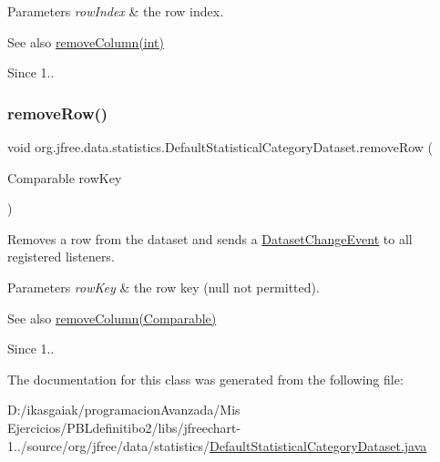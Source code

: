\begin{DoxyParams}{Parameters}
{\em row\+Index} & the row index.\\
\hline
\end{DoxyParams}
\begin{DoxySeeAlso}{See also}
\mbox{\hyperlink{classorg_1_1jfree_1_1data_1_1statistics_1_1_default_statistical_category_dataset_a1981755d8867127679bf11f59a7c62d4}{remove\+Column(int)}}
\end{DoxySeeAlso}
\begin{DoxySince}{Since}
1.. 
\end{DoxySince}
\mbox{\label{classorg_1_1jfree_1_1data_1_1statistics_1_1_default_statistical_category_dataset_a679a64d7b03d1530ebc792cb8aa01f7e}} 
\subsubsection{\texorpdfstring{remove\+Row()}{removeRow()}\hspace{0.1cm}{\footnotesize\ttfamily [2/2]}}
{\footnotesize\ttfamily void org.\+jfree.\+data.\+statistics.\+Default\+Statistical\+Category\+Dataset.\+remove\+Row (\begin{DoxyParamCaption}\item[{Comparable}]{row\+Key }\end{DoxyParamCaption})}

Removes a row from the dataset and sends a \mbox{\hyperlink{}{Dataset\+Change\+Event}} to all registered listeners.


\begin{DoxyParams}{Parameters}
{\em row\+Key} & the row key ({\ttfamily null} not permitted).\\
\hline
\end{DoxyParams}
\begin{DoxySeeAlso}{See also}
\mbox{\hyperlink{classorg_1_1jfree_1_1data_1_1statistics_1_1_default_statistical_category_dataset_a9677e48208461d7ad22a1d87eb93e6ee}{remove\+Column(\+Comparable)}}
\end{DoxySeeAlso}
\begin{DoxySince}{Since}
1.. 
\end{DoxySince}


The documentation for this class was generated from the following file\+:\begin{DoxyCompactItemize}
\item 
D\+:/ikasgaiak/programacion\+Avanzada/\+Mis Ejercicios/\+P\+B\+Ldefinitibo2/libs/jfreechart-\/1../source/org/jfree/data/statistics/\mbox{\hyperlink{_default_statistical_category_dataset_8java}{Default\+Statistical\+Category\+Dataset.\+java}}\end{DoxyCompactItemize}
